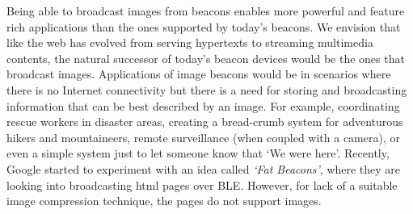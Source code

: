 


Being able to broadcast images from beacons enables more powerful and feature rich applications than the ones supported by today's beacons. We envision that like the web has evolved from serving hypertexts to streaming multimedia contents, the natural successor of today's beacon devices would be the ones that broadcast images. Applications of image beacons would be in scenarios where there is no Internet connectivity but there is a need for storing and broadcasting information that can be best described by an image. For example, coordinating rescue workers in disaster areas, creating a bread-crumb system for adventurous hikers and mountaineers, remote surveillance (when coupled with a camera), or even a simple system just to let someone know that `We were here'.  Recently, Google started to experiment with an idea called \textit{`Fat Beacons'}, where they are looking into broadcasting html pages over BLE. However, for lack of a suitable image compression technique, the pages do not support images.

